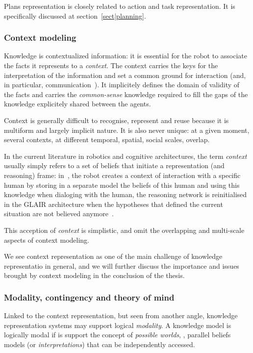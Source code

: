 Plans representation is closely related to action and task representation. It
is specifically discussed at section~\ref{sect|planning}.

\subsubsection{Context modeling}

Knowledge is contextualized information: it is essential for the robot to
associate the facts it represents to a \emph{context}. The context carries the
keys for the interpretation of the information and set a common ground for
interaction (and, in particular, communication~\cite{Jakobson1960}). It
implicitely defines the domain of validity of the facts and carries the
\emph{common-sense} knowledge required to fill the gaps of the knowledge
explicitely shared between the agents.

Context is generally difficult to recognise, represent and reuse because it is
multiform and largely implicit nature. It is also never unique: at a given
moment, several contexts, at different temporal, spatial, social scales,
overlap.

In the current literature in robotics and cognitive architectures, the term
\emph{context} usually simply refers to a set of beliefs that initiate a
representation (and reasoning) frame: in~\cite{Lemaignan2011a}, the robot
creates a context of interaction with a specific human by storing in a separate
model the beliefs of this human and using this knowledge when dialoging with
the human, the reasoning network is reinitialised in the GLAIR architecture
when the hypotheses that defined the current situation are not believed
anymore~\cite{Shapiro2009}.

This acception of \emph{context} is simplistic, and omit the overlapping and
multi-scale aspects of context modeling.

We see context representation as one of the main challenge of knowledge
representatio in general, and we will further discuss the importance and issues
brought by context modeling in the conclusion of the thesis.

\subsubsection{Modality, contingency and theory of mind}
\label{sect|possible-worlds}

Linked to the context representation, but seen from another angle, knowledge
representation systems may support logical \emph{modality}. A knowledge model
is logically modal if is support the concept of \emph{possible worlds}, \ie,
parallel beliefs models (or \emph{interpretations}) that can be independently
accessed.

